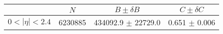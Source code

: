 \begin{tabular}{lccc}
\hline
    &   $N$   & $B \pm \delta B$  &  $C \pm \delta C$ \\
\hline
$0 < |\eta| <2.4$              & 6230885    & 434092.9   $\pm$ 22729.0 & 0.651      $\pm$ 0.006 \\
\hline
\end{tabular}
